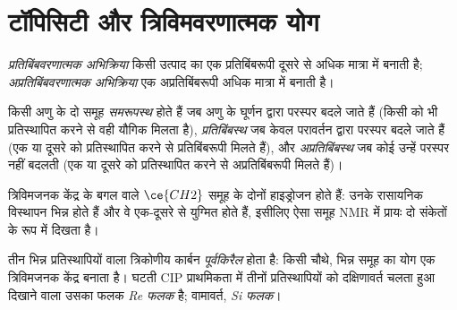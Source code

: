 \section{टॉपिसिटी और त्रिविमवरणात्मक योग}

\begin{definition}[त्रिविमवरणात्मक अभिक्रियाएँ]\label{def:b3:asymmetric-synthesis:selective}
\emph{प्रतिबिंबवरणात्मक अभिक्रिया} किसी उत्पाद का एक
प्रतिबिंबरूपी दूसरे से अधिक मात्रा में बनाती है; \emph{अप्रतिबिंबवरणात्मक
अभिक्रिया} एक अप्रतिबिंबरूपी अधिक मात्रा में बनाती है।
\end{definition}

\begin{definition}[टॉपिसिटी]\label{def:b3:asymmetric-synthesis:topicity}
किसी अणु के दो समूह \emph{समरूपस्थ} होते हैं जब
अणु के घूर्णन द्वारा परस्पर बदले जाते हैं (किसी को भी प्रतिस्थापित करने से वही यौगिक मिलता है),
\emph{प्रतिबिंबस्थ} जब केवल परावर्तन द्वारा परस्पर बदले जाते हैं
(एक या दूसरे को प्रतिस्थापित करने से प्रतिबिंबरूपी मिलते हैं), और
\emph{अप्रतिबिंबस्थ} जब कोई  उन्हें परस्पर
नहीं बदलती (एक या दूसरे को प्रतिस्थापित करने से अप्रतिबिंबरूपी मिलते हैं)।
\end{definition}

त्रिविमजनक केंद्र के बगल वाले $\ce{CH2}$ समूह के दोनों हाइड्रोजन  होते हैं: उनके
रासायनिक विस्थापन भिन्न होते हैं और वे एक-दूसरे से युग्मित होते हैं, इसीलिए ऐसा
समूह NMR में प्रायः दो संकेतों के रूप में दिखता है।

\begin{definition}[पूर्वकिरैल फलक]\label{def:b3:asymmetric-synthesis:faces}
तीन भिन्न प्रतिस्थापियों वाला त्रिकोणीय कार्बन \emph{पूर्वकिरैल} होता है:
किसी चौथे, भिन्न समूह का योग एक त्रिविमजनक केंद्र बनाता है। घटती CIP प्राथमिकता में
तीनों प्रतिस्थापियों को दक्षिणावर्त चलता हुआ दिखाने वाला उसका फलक
\emph{Re फलक} है; वामावर्त, \emph{Si फलक}।
\end{definition}

